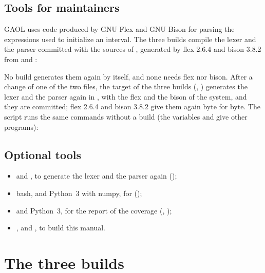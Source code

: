 \documentclass[12pt,a4paper,twoside,openright]{book}
\begin{document}
\subsection{Tools for maintainers}\label{sec:install-maintainers}

GAOL uses code produced by GNU Flex and GNU Bison for parsing the expressions
used to initialize an interval.
%
%
The three builds compile the lexer and the parser committed with the sources
of , generated by flex 2.6.4 and bison 3.8.2 from
 and
:
\begin{cmdshell}
\end{cmdshell}
No build generates them again by itself, and none needs flex nor bison. After
a change of one of the two files, the target  of the three builds
(, ) generates the lexer and the parser
again in , with the flex and the bison of the system, and
they are committed; flex 2.6.4 and bison 3.8.2 give them again byte for byte.
The script  runs the same commands
without a build (the variables  and  give other
programs):

\begin{cmdshell}
\end{cmdshell}

\subsection{Optional tools}

\begin{itemize}
\item {} and , to generate the lexer and the parser again
  ();
\item bash, and Python~3 with numpy, for  ();
\item {} and Python~3, for the report of the coverage
  (, );
\item {},  and , to build this manual.
\end{itemize}

\section{The three builds}\label{sec:three-builds}
\end{document}
